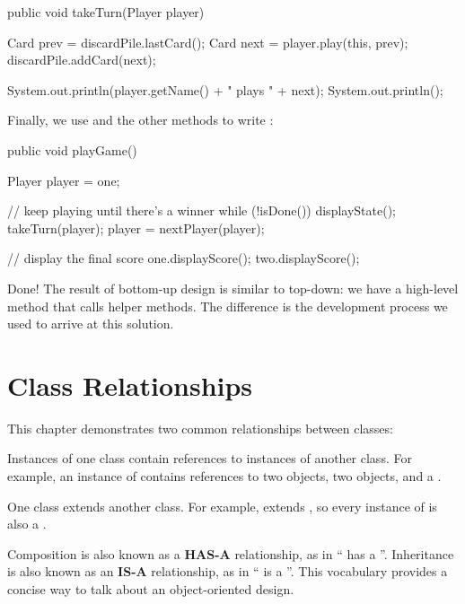 \begin{code}
public void takeTurn(Player player) {
    Card prev = discardPile.lastCard();
    Card next = player.play(this, prev);
    discardPile.addCard(next);

    System.out.println(player.getName() + " plays " + next);
    System.out.println();
}
\end{code}

Finally, we use  and the other methods to write :

\begin{code}
public void playGame() {
    Player player = one;

    // keep playing until there's a winner
    while (!isDone()) {
        displayState();
        takeTurn(player);
        player = nextPlayer(player);
    }

    // display the final score
    one.displayScore();
    two.displayScore();
}
\end{code}

Done!
The result of bottom-up design is similar to top-down: we have a high-level method that calls helper methods.
The difference is the development process we used to arrive at this solution.


\section{Class Relationships}


This chapter demonstrates two common relationships between classes:

\begin{description}

Instances of one class contain references to instances of another class.
For example, an instance of  contains references to two  objects, two  objects, and a .

One class extends another class.
For example,  extends , so every instance of  is also a .

\end{description}


Composition is also known as a {\bf HAS-A} relationship, as in `` has a ''.
Inheritance is also known as an {\bf IS-A} relationship, as in `` is a ''.
This vocabulary provides a concise way to talk about an object-oriented design.

